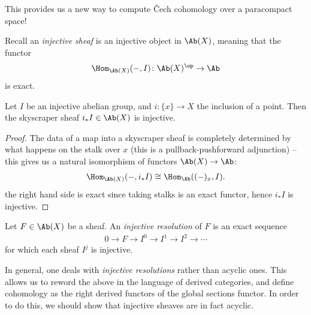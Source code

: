 \documentclass[11pt]{book}
\begin{document}
This provides us a new way to compute \v{C}ech cohomology over a paracompact space!

\begin{definition} Recall an \textit{injective sheaf} is an injective object in $\Ab(X)$, meaning that the functor
\begin{align*}
    \Hom_{\Ab(X)}(-,I) \colon \Ab(X)^\op \to \Ab
\end{align*}
is exact.
\end{definition}

\begin{example}\label{exa:skyscraper-injective} 
Let $I$ be an injective abelian group, and $i \colon \{x\} \to X$ the inclusion of a point. Then the skyscraper sheaf $i_\ast I \in \Ab(X)$ is injective.
\end{example}
\begin{proof} The data of a map into a skyscraper sheaf is completely determined by what happens on the stalk over $x$ (this is a pullback-pushforward adjunction) -- this gives us a natural isomorphism of functors $\Ab(X) \to \Ab$:
\begin{align*}
    \Hom_{\Ab(X)}(-, i_\ast I) \cong \Hom_{\Ab}((-)_x, I).
\end{align*}
the right hand side is exact since taking stalks is an exact functor, hence $i_\ast I$ is injective.
\end{proof}

\begin{definition}\label{def:injective-resolution} Let $F\in \Ab(X)$ be a sheaf. An \emph{injective resolution} of $F$ is an exact sequence
\begin{align*}
    0 \to F \to I^0 \to I^1 \to I^2 \to \cdots
\end{align*}
for which each sheaf $I^j$ is injective.
\end{definition}

\begin{remark} In general, one deals with \emph{injective resolutions} rather than acyclic ones. This allows us to reword the above in the language of derived categories, and define cohomology as the right derived functors of the global sections functor. In order to do this, we should show that injective sheaves are in fact acyclic.
\end{remark}
\end{document}

